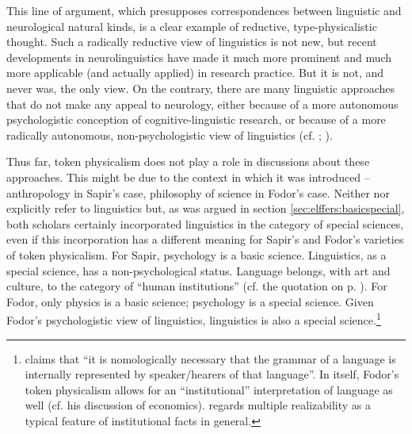 \documentclass[output=paper]{langscibook}
\begin{document}
This line of argument, which presupposes correspondences between linguistic and neurological natural kinds, is a clear example of reductive, type-physicalistic thought. Such a radically reductive view of linguistics is not new, but recent developments in neurolinguistics have made it much more prominent and much more applicable (and actually applied) in research practice. But it is not, and never was, the only view. On the contrary, there are many linguistic approaches that do not make any appeal to neurology, either because of a more autonomous psychologistic conception of cognitive-linguistic research, or because of a more radically autonomous, non-psychologistic view of linguistics (cf. \citealt{Botha1992}; \citealt{Elffers2014}).

Thus far, token physicalism does not play a role in discussions about these approaches. This might be due to the context in which it was introduced – anthropology in Sapir's case, philosophy of science in Fodor's case. Neither \citet{Sapir1917} nor \citet{Fodor1974} explicitly refer to linguistics but, as was argued in section \ref{sec:elffers:basicspecial}, both scholars certainly incorporated linguistics in the category of special sciences, even if this incorporation has a different meaning for Sapir's and Fodor's varieties of token physicalism. For Sapir, psychology is a basic science. Linguistics, as a special science, has a non-psychological status. Language belongs, with art and culture, to the category of ``human institutions'' (cf. the quotation on p. \pageref{q:elffers:huminst}). For Fodor, only physics is a basic science; psychology is a special science. Given Fodor's psychologistic view of linguistics, linguistics is also a special science.\footnote{\citet[149]{Fodor1985} claims that ``it is nomologically necessary that the grammar of a language is internally represented by speaker/hearers of that language''. In itself, Fodor's token physicalism allows for an ``institutional'' interpretation of language as well (cf. his discussion of economics). \citet[422-423]{Jones2004} regards multiple realizability as a typical feature of institutional facts in general.\label{fn:elffers:nomologically}}
\end{document}
